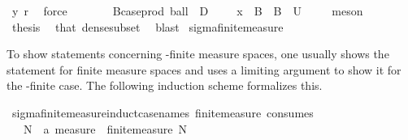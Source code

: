 \begin{isabellebody}
\ y{\isacharparenleft}{\kern0pt}{}{\isacharparenright}{\kern0pt}\ r\ \isamarkupfalse%
\ force\isanewline
\ \ \ \ \isamarkupfalse%
\ \isamarkupfalse%
\ {\isachardoublequoteopen}{\isasymexists}B{\isacharprime}{\kern0pt}{\isasymin}{\isacharparenleft}{\kern0pt}case{\isacharunderscore}{\kern0pt}prod\ ball\ {\isacharbackquote}{\kern0pt}\ {\isacharparenleft}{\kern0pt}D\ {\isasymtimes}\ {\isacharparenleft}{\kern0pt}{\isasymrat}\ {\isasyminter}\ {\isacharbraceleft}{\kern0pt}{}{\isacharless}{\kern0pt}{\isachardot}{\kern0pt}{\isachardot}{\kern0pt}{\isacharbraceright}{\kern0pt}{\isacharparenright}{\kern0pt}{\isacharparenright}{\kern0pt}{\isacharparenright}{\kern0pt}{\isachardot}{\kern0pt}\ x\ {\isasymin}\ B{\isacharprime}{\kern0pt}\ {\isasymand}\ B{\isacharprime}{\kern0pt}\ {\isasymsubseteq}\ U{\isachardoublequoteclose}\ \isamarkupfalse%
\ {\isacharasterisk}{\kern0pt}\ \isamarkupfalse%
\ meson\isanewline
\ \ \isamarkupfalse%
\isanewline
\ \ \isamarkupfalse%
\ {\isacharquery}{\kern0pt}thesis\ \isamarkupfalse%
\ that\ dense{\isacharunderscore}{\kern0pt}subset\ \isamarkupfalse%
\ blast\isanewline
{}\isamarkupfalse%
%
\endisatagproof
{\isafoldproof}%
%
\isadelimproof
\isanewline
%
\endisadelimproof
\isanewline
{}\isamarkupfalse%
\ sigma{\isacharunderscore}{\kern0pt}finite{\isacharunderscore}{\kern0pt}measure\isanewline
{}%
\begin{isamarkuptext}%
To show statements concerning \isa{{\isasymsigma}}-finite measure spaces, one usually shows the statement for finite measure spaces and uses a limiting argument to show it for the \isa{{\isasymsigma}}-finite case.
      The following induction scheme formalizes this.%
\end{isamarkuptext}\isamarkuptrue%
\isamarkupfalse%
\ sigma{\isacharunderscore}{\kern0pt}finite{\isacharunderscore}{\kern0pt}measure{\isacharunderscore}{\kern0pt}induct{\isacharbrackleft}{\kern0pt}case{\isacharunderscore}{\kern0pt}names\ finite{\isacharunderscore}{\kern0pt}measure{\isacharcomma}{\kern0pt}\ consumes\ {}{\isacharbrackright}{\kern0pt}{\isacharcolon}{\kern0pt}\isanewline
\ \ \ {\isachardoublequoteopen}{\isasymAnd}{\isacharparenleft}{\kern0pt}N\ {\isacharcolon}{\kern0pt}{\isacharcolon}{\kern0pt}\ {\isacharprime}{\kern0pt}a\ measure{\isacharparenright}{\kern0pt}\ {\isasymOmega}{\isachardot}{\kern0pt}\ finite{\isacharunderscore}{\kern0pt}measure\ N\ \isanewline

\end{isabellebody}
